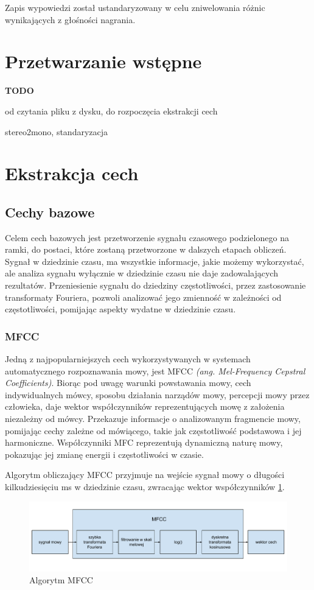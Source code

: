 \documentclass[a4paper,12pt,twoside,openany]{report}
\newcommand{\TODO}{\textbf{TODO}}
\newcommand*\NewPage{\newpage\null\thispagestyle{empty}\newpage}
\newcommand{\ang}[1]{\textit{(ang. #1)}}
\begin{document}
Zapis wypowiedzi został ustandaryzowany w celu zniwelowania różnic wynikających z głośności nagrania.
\section{Przetwarzanie wstępne}
\TODO{
	od czytania pliku z dysku, do rozpoczęcia ekstrakcji cech

	stereo2mono, standaryzacja
}
\NewPage
\section{Ekstrakcja cech}
\subsection{Cechy bazowe}
Celem cech bazowych jest przetworzenie sygnału czasowego podzielonego na ramki,
do postaci, które zostaną przetworzone w dalszych etapach obliczeń.
Sygnał w dziedzinie czasu, ma wszystkie informacje, jakie możemy wykorzystać, 
ale analiza sygnału wyłącznie w dziedzinie czasu nie daje zadowalających rezultatów.
Przeniesienie sygnału do dziedziny częstotliwości, przez zastosowanie transformaty Fouriera,
pozwoli analizować jego zmienność w zależności od częstotliwości, 
pomijając aspekty wydatne w dziedzinie czasu.
\subsubsection{MFCC}
Jedną z najpopularniejszych cech wykorzystywanych w systemach automatycznego rozpoznawania mowy,
jest MFCC \ang{Mel-Frequency Cepstral Coefficients}.
Biorąc pod uwagę warunki powstawania mowy, cech indywidualnych mówcy, sposobu działania narządów mowy, percepcji mowy przez człowieka,
daje wektor współczynników reprezentujących mowę z założenia niezależny od mówcy. 
Przekazuje informacje o analizowanym fragmencie mowy, pomijając cechy zależne od mówiącego, takie jak częstotliwość podstawowa i jej harmoniczne.
Współczynniki MFC reprezentują dynamiczną naturę mowy, pokazując jej zmianę energii i częstotliwości w czasie.

Algorytm obliczający MFCC przyjmuje na wejście sygnał mowy o długości kilkudziesięciu ms w dziedzinie czasu, zwracając wektor współczynników \ref{rys:mgcc:schemat}.
\begin{figure}[h]
	\centering
	\includegraphics[width=\textwidth]{mfcc-schemat}
	\caption{Algorytm MFCC}
	\label{rys:mgcc:schemat}
\end{figure}
\end{document}
